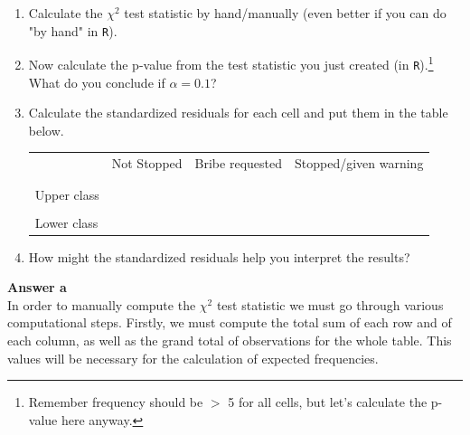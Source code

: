 \documentclass[12pt,letterpaper]{article}
\begin{document}
\begin{enumerate}
	
	\item [(a)]
	Calculate the $\chi^2$ test statistic by hand/manually (even better if you can do "by hand" in \texttt{R}).\\
	\vspace{1cm}
	
	\item [(b)]
	Now calculate the p-value from the test statistic you just created (in \texttt{R}).\footnote{Remember frequency should be $>$ 5 for all cells, but let's calculate the p-value here anyway.}  What do you conclude if $\alpha = 0.1$?\\
	
\vspace{1cm}
	\item [(c)] Calculate the standardized residuals for each cell and put them in the table below.
	\vspace{1cm}
	
	\begin{table}[h]
		\centering
		\begin{tabular}{l | c c c }
			& Not Stopped & Bribe requested & Stopped/given warning \\
			\\[-1.8ex] 
			\hline \\[-1.8ex]
			Upper class  &  &  &  \\
			\\
			Lower class &  &   &   \\
			
		\end{tabular}
	\end{table}
	
	
	\vspace{1cm}
	\item [(d)] How might the standardized residuals help you interpret the results?  
\end{enumerate}

\vspace{2cm}
\noindent\textbf{Answer a}\\
\vspace{0.5cm}
\noindent In order to manually compute the $\chi^2$ test statistic we must go through various computational steps.
\noindent Firstly, we must compute the total sum of each row and of each column, as well as the grand total of observations for the whole table. This values will be necessary for the calculation of expected frequencies. 
\end{document}
